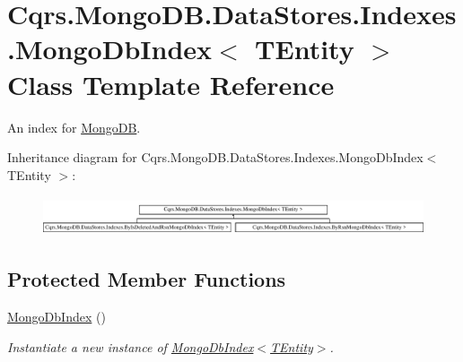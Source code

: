 \hypertarget{classCqrs_1_1MongoDB_1_1DataStores_1_1Indexes_1_1MongoDbIndex}{}\section{Cqrs.\+Mongo\+D\+B.\+Data\+Stores.\+Indexes.\+Mongo\+Db\+Index$<$ T\+Entity $>$ Class Template Reference}
\label{classCqrs_1_1MongoDB_1_1DataStores_1_1Indexes_1_1MongoDbIndex}


An index for \hyperlink{namespaceCqrs_1_1MongoDB}{Mongo\+DB}.  


Inheritance diagram for Cqrs.\+Mongo\+D\+B.\+Data\+Stores.\+Indexes.\+Mongo\+Db\+Index$<$ T\+Entity $>$\+:\begin{figure}[H]
\begin{center}
\leavevmode
\includegraphics[height=1.164241cm]{classCqrs_1_1MongoDB_1_1DataStores_1_1Indexes_1_1MongoDbIndex}
\end{center}
\end{figure}
\subsection*{Protected Member Functions}
\begin{DoxyCompactItemize}
\item 
\hyperlink{classCqrs_1_1MongoDB_1_1DataStores_1_1Indexes_1_1MongoDbIndex_a61f4b17dd968f92e81562c70ae062a89_a61f4b17dd968f92e81562c70ae062a89}{Mongo\+Db\+Index} ()
\begin{DoxyCompactList}\small\item\em Instantiate a new instance of \hyperlink{classCqrs_1_1MongoDB_1_1DataStores_1_1Indexes_1_1MongoDbIndex_a61f4b17dd968f92e81562c70ae062a89_a61f4b17dd968f92e81562c70ae062a89}{Mongo\+Db\+Index$<$\+T\+Entity$>$}. \end{DoxyCompactList}\end{DoxyCompactItemize}
